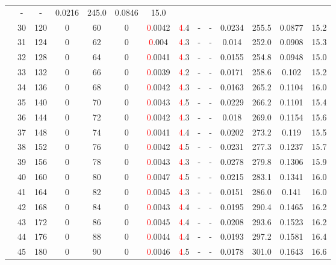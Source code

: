 \begin{table}[htb]
{\begin{tabular}{|c|c|c|c|c|c|c|c|c|c|c|c|c|c|}
 & - & -
 & 0.0216 & 245.0
 & 0.0846 & 15.0
 \\
 & 
30 & 120 & 0 & 60 & 0
 & \textcolor{red}0.0042 & \textcolor{red}4.4
 & - & -
 & 0.0234 & 255.5
 & 0.0877 & 15.2
 \\
 & 
31 & 124 & 0 & 62 & 0
 & \textcolor{red}0.004 & \textcolor{red}4.3
 & - & -
 & 0.014 & 252.0
 & 0.0908 & 15.3
 \\
 & 
32 & 128 & 0 & 64 & 0
 & \textcolor{red}0.0041 & \textcolor{red}4.3
 & - & -
 & 0.0155 & 254.8
 & 0.0948 & 15.0
 \\
 & 
33 & 132 & 0 & 66 & 0
 & \textcolor{red}0.0039 & \textcolor{red}4.2
 & - & -
 & 0.0171 & 258.6
 & 0.102 & 15.2
 \\
 & 
34 & 136 & 0 & 68 & 0
 & \textcolor{red}0.0042 & \textcolor{red}4.3
 & - & -
 & 0.0163 & 265.2
 & 0.1104 & 16.0
 \\
 & 
35 & 140 & 0 & 70 & 0
 & \textcolor{red}0.0043 & \textcolor{red}4.5
 & - & -
 & 0.0229 & 266.2
 & 0.1101 & 15.4
 \\
 & 
36 & 144 & 0 & 72 & 0
 & \textcolor{red}0.0042 & \textcolor{red}4.3
 & - & -
 & 0.018 & 269.0
 & 0.1154 & 15.6
 \\
 & 
37 & 148 & 0 & 74 & 0
 & \textcolor{red}0.0041 & \textcolor{red}4.4
 & - & -
 & 0.0202 & 273.2
 & 0.119 & 15.5
 \\
 & 
38 & 152 & 0 & 76 & 0
 & \textcolor{red}0.0042 & \textcolor{red}4.5
 & - & -
 & 0.0231 & 277.3
 & 0.1237 & 15.7
 \\
 & 
39 & 156 & 0 & 78 & 0
 & \textcolor{red}0.0043 & \textcolor{red}4.3
 & - & -
 & 0.0278 & 279.8
 & 0.1306 & 15.9
 \\
 & 
40 & 160 & 0 & 80 & 0
 & \textcolor{red}0.0047 & \textcolor{red}4.5
 & - & -
 & 0.0215 & 283.1
 & 0.1341 & 16.0
 \\
 & 
41 & 164 & 0 & 82 & 0
 & \textcolor{red}0.0045 & \textcolor{red}4.3
 & - & -
 & 0.0151 & 286.0
 & 0.141 & 16.0
 \\
 & 
42 & 168 & 0 & 84 & 0
 & \textcolor{red}0.0043 & \textcolor{red}4.4
 & - & -
 & 0.0195 & 290.4
 & 0.1465 & 16.2
 \\
 & 
43 & 172 & 0 & 86 & 0
 & \textcolor{red}0.0045 & \textcolor{red}4.4
 & - & -
 & 0.0208 & 293.6
 & 0.1523 & 16.2
 \\
 & 
44 & 176 & 0 & 88 & 0
 & \textcolor{red}0.0044 & \textcolor{red}4.4
 & - & -
 & 0.0193 & 297.2
 & 0.1581 & 16.4
 \\
 & 
45 & 180 & 0 & 90 & 0
 & \textcolor{red}0.0046 & \textcolor{red}4.5
 & - & -
 & 0.0178 & 301.0
 & 0.1643 & 16.6
 \\

\end{tabular}}
\end{table}
